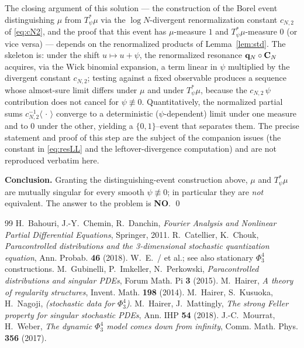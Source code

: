 \begin{remark}
The closing argument of this solution --- the construction of the Borel event
distinguishing $\mu$ from $T_\psi^*\mu$ via the $\log N$-divergent renormalization
constant $c_{N,2}$ of \eqref{eq:cN2}, and the proof that this event has $\mu$-measure
$1$ and $T_\psi^*\mu$-measure $0$ (or vice versa) --- depends on the renormalized
products of Lemma~\ref{lem:std}. The skeleton is: under the shift $u\mapsto u+\psi$,
the renormalized resonance $\mathbf{q}_N\circ\mathbf{C}_N$ acquires, via the Wick binomial
expansion, a term linear in $\psi$ multiplied by the divergent constant $c_{N,2}$;
testing against a fixed observable produces a sequence whose almost-sure limit differs
under $\mu$ and under $T_\psi^*\mu$, because the $c_{N,2}\,\psi$ contribution does not
cancel for $\psi\not\equiv0$. Quantitatively, the normalized partial sums
$c_{N,2}^{-1}\langle\,\cdot\,\rangle$ converge to a deterministic ($\psi$-dependent)
limit under one measure and to $0$ under the other, yielding a $\{0,1\}$--event that
separates them. The precise statement and proof of this step are the subject of the
companion issues (the constant in \eqref{eq:resLL} and the leftover-divergence
computation) and are not reproduced verbatim here.
\end{remark}

\noindent\textbf{Conclusion.} Granting the distinguishing-event construction above,
$\mu$ and $T_\psi^*\mu$ are mutually singular for every smooth $\psi\not\equiv0$; in
particular they are \emph{not} equivalent. The answer to the problem is \textbf{NO}.
\qed

\begin{thebibliography}{99}
 H.~Bahouri, J.-Y.~Chemin, R.~Danchin, \emph{Fourier Analysis and Nonlinear Partial Differential Equations}, Springer, 2011.
 R.~Catellier, K.~Chouk, \emph{Paracontrolled distributions and the 3-dimensional stochastic quantization equation}, Ann. Probab. \textbf{46} (2018).
 W.~E.~/ et al.; see also stationary $\Phi^4_3$ constructions.
 M.~Gubinelli, P.~Imkeller, N.~Perkowski, \emph{Paracontrolled distributions and singular PDEs}, Forum Math. Pi \textbf{3} (2015).
 M.~Hairer, \emph{A theory of regularity structures}, Invent. Math. \textbf{198} (2014).
 M.~Hairer, S.~Kusuoka, H.~Nagoji, \emph{(stochastic data for $\Phi^4_3$)}.
 M.~Hairer, J.~Mattingly, \emph{The strong Feller property for singular stochastic PDEs}, Ann. IHP \textbf{54} (2018).
 J.-C.~Mourrat, H.~Weber, \emph{The dynamic $\Phi^4_3$ model comes down from infinity}, Comm. Math. Phys. \textbf{356} (2017).
\end{thebibliography}

\endgroup
